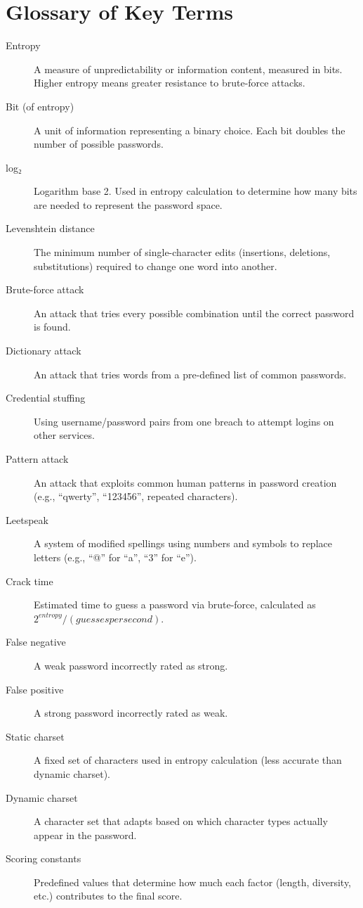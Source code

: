 \documentclass[english,12pt,twoside,a4paper]{report}
\begin{document}
\chapter{Glossary of Key Terms}
\begin{description}
    \item[Entropy] A measure of unpredictability or information content, measured in bits. Higher entropy means greater resistance to brute-force attacks.
    \item[Bit (of entropy)] A unit of information representing a binary choice. Each bit doubles the number of possible passwords.
    \item[log₂] Logarithm base 2. Used in entropy calculation to determine how many bits are needed to represent the password space.
    \item[Levenshtein distance] The minimum number of single-character edits (insertions, deletions, substitutions) required to change one word into another.
    \item[Brute-force attack] An attack that tries every possible combination until the correct password is found.
    \item[Dictionary attack] An attack that tries words from a pre-defined list of common passwords.
    \item[Credential stuffing] Using username/password pairs from one breach to attempt logins on other services.
    \item[Pattern attack] An attack that exploits common human patterns in password creation (e.g., ``qwerty'', ``123456'', repeated characters).
    \item[Leetspeak] A system of modified spellings using numbers and symbols to replace letters (e.g., ``@'' for ``a'', ``3'' for ``e'').
    \item[Crack time] Estimated time to guess a password via brute-force, calculated as $2^{entropy} / (guesses per second)$.
    \item[False negative] A weak password incorrectly rated as strong.
    \item[False positive] A strong password incorrectly rated as weak.
    \item[Static charset] A fixed set of characters used in entropy calculation (less accurate than dynamic charset).
    \item[Dynamic charset] A character set that adapts based on which character types actually appear in the password.
    \item[Scoring constants] Predefined values that determine how much each factor (length, diversity, etc.) contributes to the final score.

\end{description}
\end{document}
